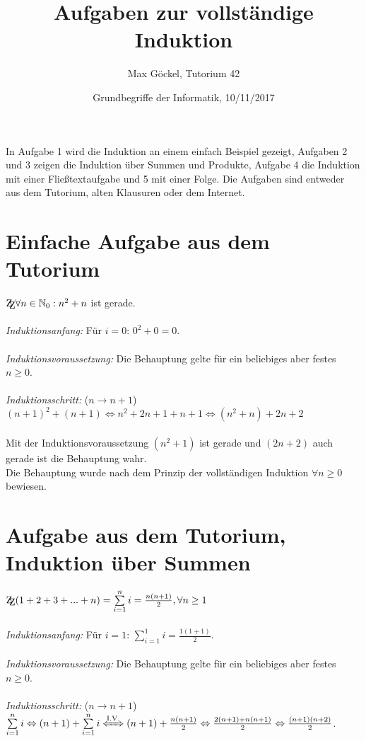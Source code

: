 \documentclass[11pt]{article} %
\title{Aufgaben zur vollständige Induktion}
\author{Max Göckel, Tutorium 42}
\date{Grundbegriffe der Informatik, 10/11/2017}
\newcommand{\zz}{\mathrm{Z\kern-.3em\raise-0.5ex\hbox{Z}}} %
\begin{document}
\maketitle
In Aufgabe 1 wird die Induktion an einem einfach Beispiel gezeigt, Aufgaben 2 und 3 zeigen die Induktion über Summen und Produkte, Aufgabe 4 die Induktion mit einer Fließtextaufgabe und 5 mit einer Folge. Die Aufgaben sind entweder aus dem Tutorium, alten Klausuren oder dem Internet.



\section{Einfache Aufgabe aus dem Tutorium}
$\zz \forall n \in \mathbb{N}_0: n^2 + n$ ist gerade.\\
\ \\
\emph{Induktionsanfang:} Für $i=0$: $0^2+0 = 0$.\\
\ \\
\emph{Induktionsvoraussetzung:} Die Behauptung gelte für ein beliebiges aber festes $n \geq 0$.\\
\ \\
\emph{Induktionsschritt:} ($n \rightarrow n+1$)\\
$(n+1)^2 + (n+1) \Leftrightarrow n^2 +2n+1+n+1 \Leftrightarrow (n^2 +n) + 2n +2$\\
\ \\
Mit der Induktionsvoraussetzung $(n^2 + 1)$ ist gerade und $(2n + 2)$ auch gerade ist die Behauptung wahr.\\

Die Behauptung wurde nach dem Prinzip der vollständigen Induktion $\forall n \geq 0$ bewiesen.
\ \\



\section{Aufgabe aus dem Tutorium, Induktion über Summen}
$\zz (1+2+3+...+n)= \sum \limits_{i=1}^n i = \frac{n(n+1)}{2}, \forall n \geq 1$\\
\ \\
\emph{Induktionsanfang:} Für $i=1$: $\sum \limits_{i=1}^1 i = \frac{1(1+1)}{2}$.\\
\ \\
\emph{Induktionsvoraussetzung:} Die Behauptung gelte für ein beliebiges aber festes $n \geq 0$.\\
\ \\
\emph{Induktionsschritt:} ($n \rightarrow n+1$)\\
$\sum \limits_{i=1}^n i \Leftrightarrow (n+1) + \sum \limits_{i=1}^n i \xLeftrightarrow{\text{I.V.}} (n+1) + \frac{n(n+1)}{2} \Leftrightarrow \frac{2(n+1) + n(n+1)}{2} \Leftrightarrow \frac{(n+1)(n+2)}{2}$.\\
\end{document}
